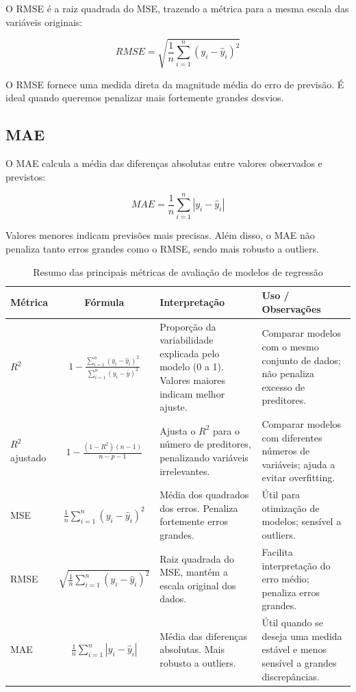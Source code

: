 \documentclass{article}
\begin{document}
O RMSE é a raiz quadrada do MSE, trazendo a métrica para a mesma escala das variáveis
originais:

\begin{equation}
    RMSE = \sqrt{\frac{1}{n}\sum_{i = 1}^{n}(y_i - \hat{y}_i)^2}
\end{equation}

O RMSE fornece uma medida direta da magnitude média do erro de previsão. É ideal quando
queremos penalizar mais fortemente grandes desvios.

\subsection{MAE}

O MAE calcula a média das diferenças absolutas entre valores observados e previstos:

\begin{equation}
    MAE = \frac{1}{n}\sum_{i = 1}^{n}|y_i - \hat{y}_i|
\end{equation}

Valores menores indicam previsões mais precisas. Além disso, o MAE não penaliza
tanto erros grandes como o RMSE, sendo mais robusto a outliers.

\begin{table}[H]
\centering
\caption{Resumo das principais métricas de avaliação de modelos de regressão}
\begin{tabular}{@{} l c p{5cm} p{6cm} @{}}
\toprule
\textbf{Métrica} & \textbf{Fórmula} & \textbf{Interpretação} & \textbf{Uso / Observações} \\
\midrule
$R^2$ & $1 - \frac{\sum_{i=1}^{n} (y_i - \hat{y}_i)^2}{\sum_{i=1}^{n} (y_i - \bar{y})^2}$ & Proporção da variabilidade explicada pelo modelo (0 a 1). Valores maiores indicam melhor ajuste. & Comparar modelos com o mesmo conjunto de dados; não penaliza excesso de preditores. \\
$R^2$ ajustado & $1 - \frac{(1-R^2)(n-1)}{n-p-1}$ & Ajusta o $R^2$ para o número de preditores, penalizando variáveis irrelevantes. & Comparar modelos com diferentes números de variáveis; ajuda a evitar overfitting. \\
MSE & $\frac{1}{n} \sum_{i=1}^{n} (y_i - \hat{y}_i)^2$ & Média dos quadrados dos erros. Penaliza fortemente erros grandes. & Útil para otimização de modelos; sensível a outliers. \\
RMSE & $\sqrt{\frac{1}{n} \sum_{i=1}^{n} (y_i - \hat{y}_i)^2}$ & Raiz quadrada do MSE, mantém a escala original dos dados. & Facilita interpretação do erro médio; penaliza erros grandes. \\
MAE & $\frac{1}{n} \sum_{i=1}^{n} |y_i - \hat{y}_i|$ & Média das diferenças absolutas. Mais robusto a outliers. & Útil quando se deseja uma medida estável e menos sensível a grandes discrepâncias. \\
\bottomrule
\end{tabular}
\label{tab:metricas_regressao}
\end{table}
\end{document}

